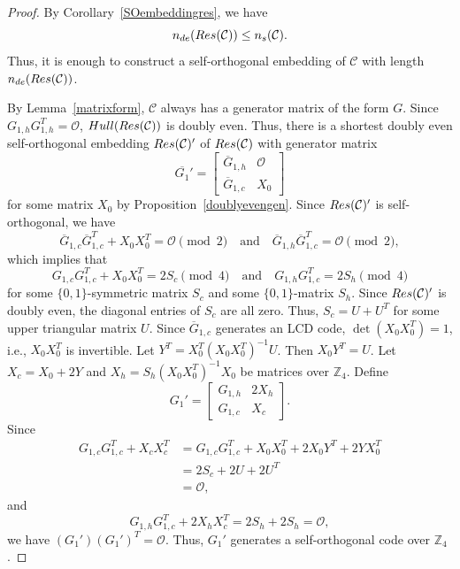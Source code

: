 \documentclass[10pt,a4paper]{amsart}
\begin{document}
\begin{proof}
    By Corollary~\ref{SOembeddingres}, we have
    \[
        n_{de}({\rm Res}(\mathcal C))\le n_s(\mathcal C).
    \]
    Thus, it is enough to construct a self-orthogonal embedding of $\mathcal C$ with length $n_{de}({\rm Res}(\mathcal C))$.



    By Lemma~\ref{matrixform}, $\mathcal{C}$ always has a generator matrix of the form $G$. Since $G_{1, h}G_{1, h}^T=\mathcal{O}$, ${\rm{Hull}}({\rm Res}(\mathcal{C}))$ is doubly even. Thus, there is a shortest doubly even self-orthogonal embedding ${\rm{Res}}(\mathcal{C})'$ of ${\rm{Res}}(\mathcal{C})$ with generator matrix
    \[
    \overline{G_1}'=\begin{bmatrix}
        \overline{G}_{1, h} & \mathcal{O}\\\overline{G}_{1, c} & X_0
    \end{bmatrix}
    \]
    for some matrix $X_0$ by Proposition~\ref{doublyevengen}. Since ${\rm{Res}}(\mathcal{C})'$ is self-orthogonal, we have
    \[
    \overline{G}_{1, c}\overline{G}_{1, c}^T+X_0X_0^T=\mathcal{O}\pmod 2\quad\mbox{and}\quad\overline{G}_{1, h}\overline{G}_{1, c}^T=\mathcal{O}\pmod 2,
    \]
    which implies that
    \[
    G_{1, c}G_{1, c}^T+X_0X_0^T=2S_c\pmod 4\quad\mbox{and}\quad G_{1, h}G_{1, c}^T=2S_h\pmod 4
    \]
    for some $\{0, 1\}$-symmetric matrix $S_c$ and some $\{0, 1\}$-matrix $S_h$. Since ${\rm{Res}}(\mathcal{C})'$ is doubly even, the diagonal entries of $S_c$ are all zero. Thus, $S_c=U+U^T$ for some upper triangular matrix $U$. Since $\overline{G}_{1, c}$ generates an LCD code, $\det(X_0X_0^T)=1$, i.e., $X_0X_0^T$ is invertible. Let $Y^T=X_0^T(X_0X_0^T)^{-1}U$. Then $X_0Y^T=U$. Let $X_c=X_0+2Y$ and $X_h=S_h(X_0X_0^T)^{-1}X_0$ be matrices over $\mathbb{Z}_4$. Define
    \[
    G_1'=\begin{bmatrix}
        G_{1, h} & 2X_h\\G_{1, c} & X_c
    \end{bmatrix}.
    \]
    Since
    \begin{align*}
    G_{1, c}G_{1, c}^T+X_cX_c^T&=G_{1, c}G_{1, c}^T+X_0X_0^T+2X_0Y^T+2YX_0^T\\&=2S_c+2U+2U^T\\&=\mathcal{O},
    \end{align*}
    and
    \[
    G_{1, h}G_{1, c}^T+2X_hX_c^T=2S_h+2S_h=\mathcal{O},
    \]
    we have $(G_1')(G_1')^T=\mathcal{O}$. Thus, $G_1'$ generates a self-orthogonal code over $\mathbb{Z}_4$. 
    

\end{proof}
\end{document}
